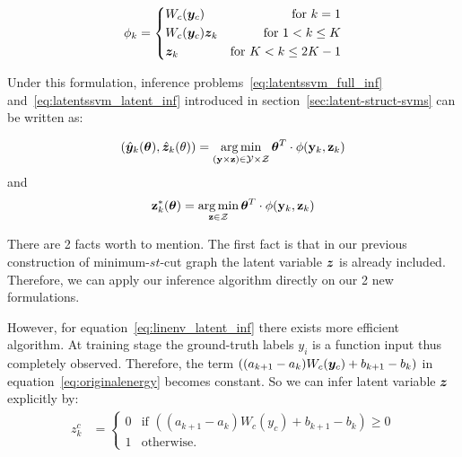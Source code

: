 \begin{equation}
\label{eq:llsvm_feature}
  \phi_k = \left\{
		\begin{aligned}
      & W_c({\bm{y}}_c) 	& \text{for} \ k=1\\
      & W_c({\bm{y}}_c){\bm{z}}_k & \text{for}\ 1<k\le K\\
      & {\bm{z}}_k & \text{for} \ K<k\le2K-1\\
		\end{aligned}
  \right.
\end{equation}

Under this formulation, inference
problems~\eqref{eq:latentssvm_full_inf}
and~\eqref{eq:latentssvm_latent_inf} introduced in
section~\ref{sec:latent-struct-svms} can be written as:

\begin{align}
  \label{eq:linenv_full_inf}
  (\hat{{\bm{y}}}_k({\bm{\theta}}),\hat{{\bm{z}}}_k(\theta))=\operatorname*{arg\,min}_{(\mathbf{y}
  \times \mathbf{z}) \in \mathcal{Y} \times \mathcal{Z}}
  {\bm{\theta}}^T\cdot\phi(\mathbf{y}_k,\mathbf{z}_k)
\end{align}
and
\begin{align}
  \label{eq:linenv_latent_inf}
  \mathbf{z}^*_k({\bm{\theta}}) = \operatorname*{arg\,min}_{\mathbf{z} \in \mathcal{Z}}
  {\bm{\theta}}^T \cdot \phi(\mathbf{y}_k,\mathbf{z}_k)
\end{align}

There are 2 facts worth to mention. The first fact is
that in our previous construction of minimum-$st$-cut graph the
latent variable ${\bm{z}}$ is already included. Therefore, we can
apply our inference algorithm directly on our 2 new formulations.

However, for equation~\eqref{eq:linenv_latent_inf} there exists
more efficient algorithm. At training stage the ground-truth
labels $y_i$ is a function input thus completely observed.
Therefore, the term $((a_{k+1}-a_k)W_c({\bm{y}}_c)+b_{k+1}-b_k)$ in
equation~\ref{eq:originalenergy} becomes constant. So we can
infer latent variable ${\bm{z}}$ explicitly by:
\begin{align}
  \label{eq:linenv_effi_infer_latent}
  z_k^c &=
          \begin{cases}
            0 & \text{if $((a_{k+1}-a_k)W_c(y_c)+b_{k+1}-b_k)\geq0$} \\
            1 & \text{otherwise}.
          \end{cases}
\end{align}

